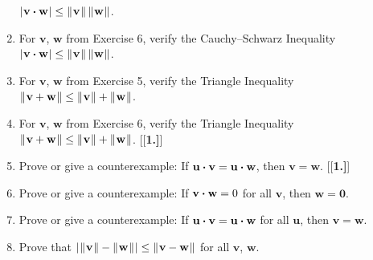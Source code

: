 \begin{enumerate}[\bfseries 1.]
  $\lvert\mspace{1mu}\mathbf{v} \bm{\cdot} \mathbf{w}\mspace{1mu}\rvert \le \lVert\mspace{1mu}\mathbf{v}\mspace{1mu}\rVert\,\lVert\mspace{1mu}\mathbf{w}\mspace{1mu}\rVert$.
 \item For $\mathbf{v}$, $\mathbf{w}$ from Exercise 6, verify the Cauchy--Schwarz Inequality
  $\lvert\mspace{1mu}\mathbf{v} \bm{\cdot} \mathbf{w}\mspace{1mu}\rvert \le \lVert\mspace{1mu}\mathbf{v}\mspace{1mu}\rVert\,\lVert\mspace{1mu}\mathbf{w}\mspace{1mu}\rVert$.
 \item For $\mathbf{v}$, $\mathbf{w}$ from Exercise 5, verify the Triangle Inequality
  $\lVert\mspace{1mu}\mathbf{v} + \mathbf{w}\mspace{1mu}\rVert \le \lVert\mspace{1mu}\mathbf{v}\mspace{1mu}\rVert + \lVert\mspace{1mu}\mathbf{w}\mspace{1mu}\rVert$.
 \item For $\mathbf{v}$, $\mathbf{w}$ from Exercise 6, verify the Triangle Inequality
  $\lVert\mspace{1mu}\mathbf{v} + \mathbf{w}\mspace{1mu}\rVert \le \lVert\mspace{1mu}\mathbf{v}\mspace{1mu}\rVert + \lVert\mspace{1mu}\mathbf{w}\mspace{1mu}\rVert$.
\smallskip
{}[{[\bfseries 1.]}]
 \item Prove or give a counterexample: If $\mathbf{u} \bm{\cdot} \mathbf{v} = \mathbf{u} \bm{\cdot} \mathbf{w}$,
  then $\mathbf{v} =\mathbf{w}$.
[{[\bfseries 1.]}]
 \item Prove or give a counterexample: If $\mathbf{v} \bm{\cdot} \mathbf{w} = 0$ for all $\mathbf{v}$, then
  $\mathbf{w} =\mathbf{0}$.
 \item Prove or give a counterexample: If $\mathbf{u} \bm{\cdot} \mathbf{v} = \mathbf{u} \bm{\cdot} \mathbf{w}$
  for all $\mathbf{u}$, then $\mathbf{v} =\mathbf{w}$.
 \item Prove that $\left|\mspace{1mu}\lVert\mspace{1mu}\mathbf{v}\mspace{1mu}\rVert - \lVert\mspace{1mu}\mathbf{w}\mspace{1mu}\rVert\mspace{1mu}\right| \le \lVert\mspace{1mu}\mathbf{v} - \mathbf{w}\mspace{1mu}\rVert$ for all
  $\mathbf{v}$, $\mathbf{w}$.


\end{enumerate}
